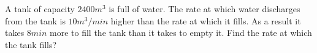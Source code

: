 
%
%
%
%
% 
% 

\question A tank of capacity $2400m^3$ is full of water. The rate at which water discharges from the tank is $10m^3/min$ higher than the rate at which it fills. As a result it takes $8min$ more to fill the tank than it takes to empty it. Find the rate at which the tank fills?

\insertQR{}

\ifprintanswers
\fi 

